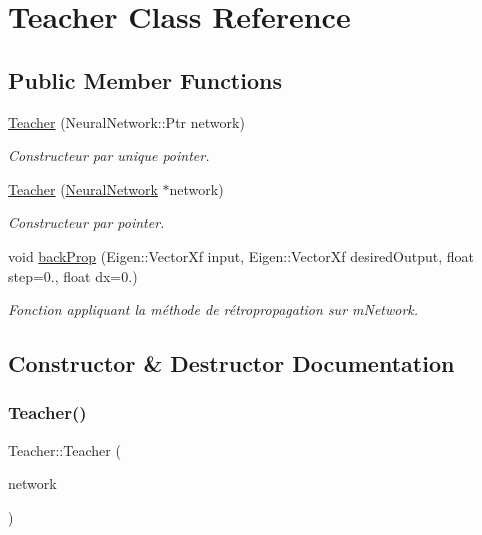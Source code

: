 \hypertarget{classTeacher}{}\section{Teacher Class Reference}
\label{classTeacher}
\subsection*{Public Member Functions}
\begin{DoxyCompactItemize}
\item 
\hyperlink{classTeacher_a8ca95fc7a29e082a676d420b9fd8fd67}{Teacher} (Neural\+Network\+::\+Ptr network)
\begin{DoxyCompactList}\small\item\em Constructeur par unique pointer. \end{DoxyCompactList}\item 
\hyperlink{classTeacher_afd32ab70242f2c5886d030a5e7d05919}{Teacher} (\hyperlink{classNeuralNetwork}{Neural\+Network} $\ast$network)
\begin{DoxyCompactList}\small\item\em Constructeur par pointer. \end{DoxyCompactList}\item 
void \hyperlink{classTeacher_a038afb323ffc518a3a3af5044f931442}{back\+Prop} (Eigen\+::\+Vector\+Xf input, Eigen\+::\+Vector\+Xf desired\+Output, float step=0., float dx=0.)
\begin{DoxyCompactList}\small\item\em Fonction appliquant la méthode de rétropropagation sur m\+Network. \end{DoxyCompactList}\end{DoxyCompactItemize}


\subsection{Constructor \& Destructor Documentation}
\mbox{\label{classTeacher_a8ca95fc7a29e082a676d420b9fd8fd67}} 
\subsubsection{\texorpdfstring{Teacher()}{Teacher()}\hspace{0.1cm}{\footnotesize\ttfamily [1/2]}}
{\footnotesize\ttfamily Teacher\+::\+Teacher (\begin{DoxyParamCaption}\item[{Neural\+Network\+::\+Ptr}]{network }\end{DoxyParamCaption})}



